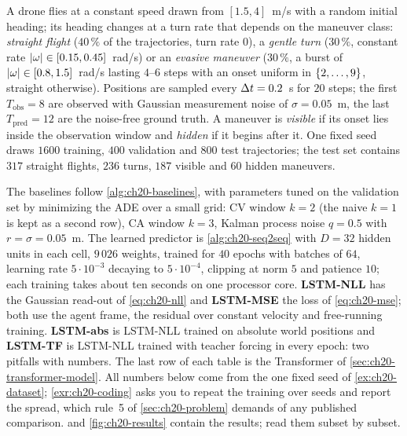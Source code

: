 \begin{example}
\label{ex:ch20-dataset}
A drone flies at a constant speed drawn from $[1.5, 4]$~m/s with a random
initial heading; its heading changes at a turn rate that depends on the
maneuver class: \emph{straight flight} ($40\,\%$ of the trajectories, turn
rate $0$), a \emph{gentle turn} ($30\,\%$, constant rate $\left\lvert \omega \right\rvert \in
[0.15, 0.45]$~rad/s) or an \emph{evasive maneuver} ($30\,\%$, a burst of
$\left\lvert \omega \right\rvert \in [0.8, 1.5]$~rad/s lasting $4$--$6$ steps with an onset
uniform in $\left\{ 2, \dots, 9 \right\}$, straight otherwise). Positions are sampled
every $\Delta t = 0.2$~s for $20$ steps; the first $T_{\mathrm{obs}} = 8$ are
observed with Gaussian measurement noise of $\sigma = 0.05$~m, the last
$T_{\mathrm{pred}} = 12$ are the noise-free ground truth. A maneuver is
\emph{visible} if its onset lies inside the observation window and
\emph{hidden} if it begins after it. One fixed seed draws $1600$ training,
$400$ validation and $800$ test trajectories; the test set contains $317$
straight flights, $236$ turns, $187$ visible and $60$ hidden maneuvers.
\end{example}

The baselines follow \cref{alg:ch20-baselines}, with parameters tuned on the
validation set by minimizing the ADE over a small grid: CV window $k = 2$
(the naive $k = 1$ is kept as a second row), CA window $k = 3$, Kalman
process noise $q = 0.5$ with $r = \sigma = 0.05$~m. The learned predictor is
\cref{alg:ch20-seq2seq} with $D = 32$ hidden units in each cell, $9\,026$
weights, trained for $40$ epochs with batches of
$64$, learning rate $5 \cdot 10^{-3}$ decaying to $5 \cdot 10^{-4}$, clipping
at norm $5$ and patience $10$; each training takes about ten seconds on one
processor core. \textbf{LSTM-NLL} has the Gaussian read-out of
\cref{eq:ch20-nll} and \textbf{LSTM-MSE} the loss of \cref{eq:ch20-mse}; both
use the agent frame, the residual over constant velocity and free-running
training. \textbf{LSTM-abs} is LSTM-NLL trained on absolute world positions
and \textbf{LSTM-TF} is LSTM-NLL trained with teacher forcing in every epoch:
two pitfalls with numbers. The last row of each table is the Transformer of
\cref{sec:ch20-transformer-model}. All numbers below come from the one fixed
seed of \cref{ex:ch20-dataset};
\cref{exr:ch20-coding} asks you to repeat the training over seeds and report
the spread, which rule~5 of \cref{sec:ch20-problem} demands of any published
comparison.
 and \cref{fig:ch20-results} contain
the results; read them subset by subset.


